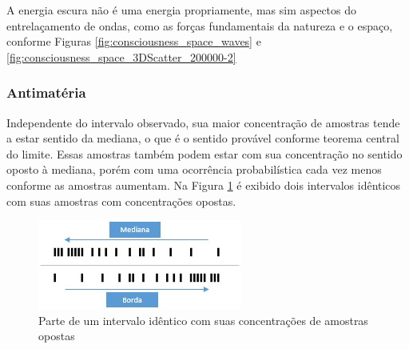 A energia escura não é uma energia propriamente, mas sim aspectos do entrelaçamento de ondas, como as forças fundamentais da natureza e o espaço, conforme Figuras \ref{fig:consciousness_space_waves} e \ref{fig:consciousness_space_3DScatter_200000-2}

\subsubsection{Antimatéria}
Independente do intervalo observado, sua maior concentração de amostras tende a estar sentido da mediana, o que é o sentido provável conforme teorema central do limite. Essas amostras também podem estar com sua concentração no sentido oposto à mediana, porém com uma ocorrência probabilística cada vez menos conforme as amostras aumentam. Na Figura \ref{fig:consciousness_concentration_of_opposite_samples} é exibido dois intervalos idênticos com suas amostras com concentrações opostas.
	\begin{figure}[H]
	\caption{Parte de um intervalo idêntico com suas concentrações de amostras opostas}
	\label{fig:consciousness_concentration_of_opposite_samples}
	\centering
	\includegraphics[scale=1]{sections/images/consciousness_concentration_of_opposite_samples.jpg}
	\end{figure}

